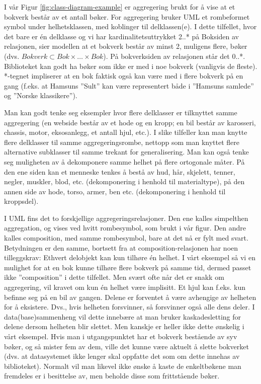 I vår Figur \ref{fig:class-diagram-example} er aggregering brukt for å vise at et bokverk består av et antall bøker. For aggregering bruker UML et rombeformet symbol under helhetsklassen, med koblinger til delklassen(e). I dette tilfellet, hvor det bare er én delklasse og vi har kardinalitetsuttrykket 2..* på Boksiden av relasjonen, sier modellen at et bokverk består av minst 2, muligens flere, bøker (dvs. $ Bokverk \subset Bok \times … \times Bok $). På bokverksiden av relasjonen står det 0..*. Biblioteket kan godt ha bøker som ikke er med i noe bokverk (vanligvis de fleste). *-tegnet impliserer at en bok faktisk også kan være med i flere bokverk på en gang (f.eks. at Hamsuns ”Sult” kan være representert både i ”Hamsuns samlede” og ”Norske klassikere”). 

Man kan godt tenke seg eksempler hvor flere delklasser er tilknyttet samme aggregering (en webside består av et hode og en kropp; en bil består av karosseri, chassis, motor, eksosanlegg, et antall hjul, etc.). I slike tilfeller kan man knytte flere delklasser til samme aggregeringsrombe, nettopp som man knyttet flere alternative subklasser til samme trekant for generalisering. Man kan også tenke seg muligheten av å dekomponere samme helhet på flere ortogonale måter. På den ene siden kan et menneske tenkes å bestå av hud, hår, skjelett, tenner, negler, muskler, blod, etc. (dekomponering i henhold til materialtype), på den annen side av hode, torso, armer, ben etc. (dekomponering i henhold til kroppsdel).

I UML fins det to forskjellige aggregeringsrelasjoner. Den ene kalles simpelthen aggregation, og vises ved hvitt rombesymbol, som brukt i vår figur. Den andre kalles composition, med samme rombesymbol, bare at det nå er fylt med svart. Betydningen er den samme, bortsett fra at composition-relasjonen har noen tilleggskrav:
Ethvert delobjekt kan kun tilhøre én helhet. I vårt eksempel så vi en mulighet for at en bok kunne tilhøre flere bokverk på samme tid, dermed passet ikke ”composition” i dette tilfellet. Men svært ofte når det er snakk om aggregering, vil kravet om kun én helhet være implisitt. Et hjul kan f.eks. kun befinne seg på en bil av gangen.
Delene er forventet å være avhengige av helheten for å eksistere. Dvs., hvis helheten forsvinner, så forsvinner også alle dens deler. I data(base)sammenheng vil dette innebære at man bruker kaskadesletting for delene dersom helheten blir slettet. Men kanskje er heller ikke dette ønskelig i vårt eksempel. Hvis man i utgangspunktet har et bokverk bestående av syv bøker, og så mister fem av dem, ville det kunne være aktuelt å slette bokverket (dvs. at datasystemet ikke lenger skal oppfatte det som om dette innehas av biblioteket). Normalt vil man likevel ikke ønske å kaste de enkeltbøkene man fremdeles er i besittelse av, men beholde disse som frittstående bøker.


